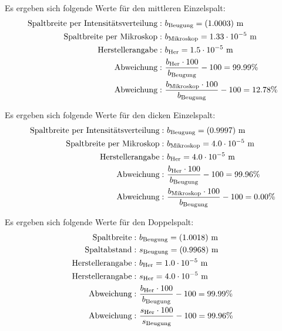 Es ergeben sich folgende Werte für den mittleren Einzelspalt:
\begin{align*}
  \text{Spaltbreite per Intensitätsverteilung}:& \ b_\text{Beugung} = (\num{1.0003 +- 0.0}) \ \text{m} \\
  \text{Spaltbreite per Mikroskop}:& \ b_\text{Mikroskop} = 1.33 \cdot 10^{-5} \ \text{m} \\
  \text{Herstellerangabe}:& \ b_\text{Her} = 1.5 \cdot 10^{-5} \ \text{m} \\
  \text{Abweichung}:& \ \frac{b_\text{Her} \cdot 100}{b_\text{Beugung}} - 100 = 99.99 \% \\
  \text{Abweichung}:& \ \frac{b_\text{Mikroskop} \cdot 100}{b_\text{Beugung}} - 100 = 12.78 \%
\end{align*}

Es ergeben sich folgende Werte für den dicken Einzelspalt:
\begin{align*}
  \text{Spaltbreite per Intensitätsverteilung}:& \ b_\text{Beugung} = (\num{0.9997 +- 0.0}) \ \text{m} \\
  \text{Spaltbreite per Mikroskop}:& \ b_\text{Mikroskop} = 4.0 \cdot 10^{-5} \ \text{m} \\
  \text{Herstellerangabe}:& \ b_\text{Her} = 4.0 \cdot 10^{-5} \ \text{m} \\
  \text{Abweichung}:& \ \frac{b_\text{Her} \cdot 100}{b_\text{Beugung}} - 100 = 99.96 \% \\
  \text{Abweichung}:& \ \frac{b_\text{Mikroskop} \cdot 100}{b_\text{Beugung}} - 100 = 0.00 \%
\end{align*}

Es ergeben sich folgende Werte für den Doppelspalt:
\begin{align*}
  \text{Spaltbreite}:& \ b_\text{Beugung} = (\num{1.0018 +- 0.0}) \ \text{m} \\
  \text{Spaltabstand}:& \ s_\text{Beugung} = (\num{0.9968 +- 0.0}) \ \text{m} \\
  \text{Herstellerangabe}:& \ b_\text{Her} = 1.0 \cdot 10^{-5} \ \text{m} \\
  \text{Herstellerangabe}:& \ s_\text{Her} = 4.0 \cdot 10^{-5} \ \text{m} \\
  \text{Abweichung}:& \ \frac{b_\text{Her} \cdot 100}{b_\text{Beugung}} - 100 = 99.99 \% \\
    \text{Abweichung}:& \ \frac{s_\text{Her} \cdot 100}{s_\text{Beugung}} - 100 = 99.96 \% \\
\end{align*}
